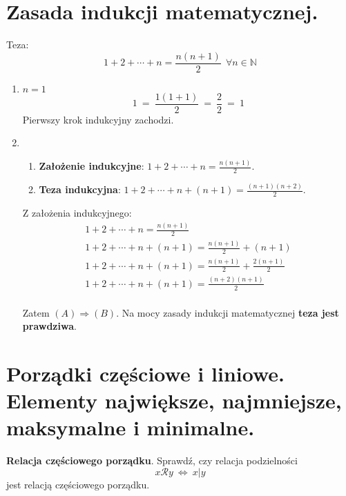 \documentclass[main.tex]{subfiles}
\begin{document}
    \section{Zasada indukcji matematycznej.}

    \begin{exercise}
        Teza:
        \[1 + 2 + \cdots + n = \frac{n(n+1)}{2} ~~ \forall n \in \mathbb{N}\]
    \end{exercise}

    \begin{enumerate}
        \item $n = 1$
        \[1 ~ = ~ \frac{1(1+1)}{2} ~ = ~ \frac{2}{2} ~ = ~ 1\]
        Pierwszy krok indukcyjny zachodzi.

        \item
        \begin{enumerate}[label=(\Alph*)]
            \item \textbf{Założenie indukcyjne}: $1 + 2 + \cdots + n = \frac{n(n+1)}{2}$.
            \item \textbf{Teza indukcyjna}: $1 + 2 + \cdots + n + (n+1) = \frac{(n+1)(n+2)}{2}$.
        \end{enumerate}

        Z założenia indukcyjnego:
        \begin{gather*}
            1 + 2 + \cdots + n = \frac{n(n+1)}{2}\\
            1 + 2 + \cdots + n + (n+1) = \frac{n(n+1)}{2} + (n+1)\\
            1 + 2 + \cdots + n + (n+1) = \frac{n(n+1)}{2} + \frac{2(n+1)}{2}\\
            1 + 2 + \cdots + n + (n+1) = \frac{(n+2)(n+1)}{2}\\
        \end{gather*}

        Zatem $(A) \Rightarrow (B)$. Na mocy zasady indukcji matematycznej \textbf{teza jest prawdziwa}.

    \end{enumerate}

    \newpage

    \section{Porządki częściowe i liniowe. Elementy największe, najmniejsze, maksymalne i minimalne.}

    \begin{exercise}
        \textbf{Relacja częściowego porządku}. Sprawdź, czy relacja podzielności
        \[ x \mathcal{R} y ~ \Leftrightarrow ~ x | y \]
        jest relacją częściowego porządku.
    \end{exercise}
\end{document}
